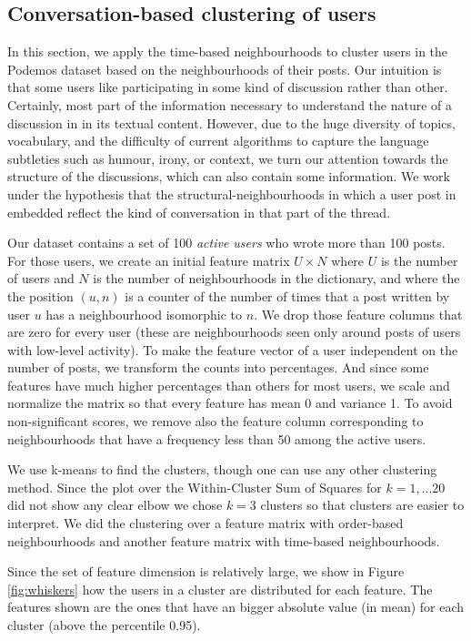 \documentclass[conference]{IEEEtran}
\begin{document}
\subsection{Conversation-based clustering of users}
In this section, we apply the time-based neighbourhoods to cluster users in the Podemos dataset based on the neighbourhoods of their posts. Our intuition is that some users like participating in some kind of discussion rather than other. Certainly, most part of the information necessary to understand the nature of a discussion in in its textual content. However, due to the huge diversity of topics, vocabulary, and the difficulty of current algorithms to capture the language subtleties such as humour, irony, or context, we turn our attention towards the structure of the discussions, which can also contain some information. We work under the  hypothesis that the structural-neighbourhoods in which a user post in embedded reflect the kind of conversation in that part of the thread. 

Our dataset contains a set of 100 \textit{active users} who wrote more than 100 posts. For those users, we create an initial feature matrix $U\times N$ where $U$ is the number of users and $N$ is the number of neighbourhoods in the dictionary, and where the the position $(u,n)$ is a counter of the number of times that a post written by user $u$ has a neighbourhood isomorphic to $n$. We drop those feature columns that are zero for every user (these are neighbourhoods seen only around posts of users with low-level activity). To make the feature vector of a user independent on the number of posts, we transform the counts into percentages. And since some features have much higher percentages than others for most users, we scale and normalize the matrix so that every feature has mean 0 and variance 1. To avoid non-significant scores, we remove also the feature column corresponding to neighbourhoods that have a frequency less than 50 among the active users.

We use k-means to find the clusters, though one can use any other clustering method. Since the plot over the Within-Cluster Sum of Squares for $k=1,...20$ did not show any clear elbow we chose $k=3$ clusters so that clusters are easier to interpret. We did the clustering over a feature matrix with order-based neighbourhoods and another feature matrix with time-based neighbourhoods.

Since the set of feature dimension is relatively large, we show in Figure \ref{fig:whiskers} how the users in a cluster are distributed for each feature. The features shown are the ones that have an bigger absolute value (in mean) for each cluster (above the percentile 0.95).
\end{document}
